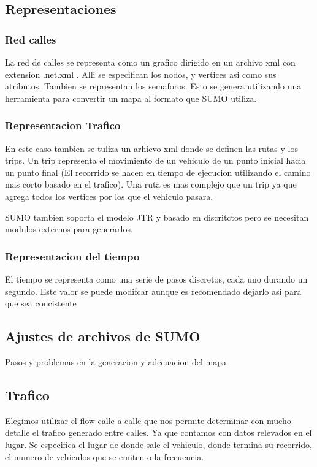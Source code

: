 \subsection{Representaciones}

\subsubsection{Red calles}
La red de calles se representa como un grafico dirigido en un archivo xml con extension .net.xml . Alli se especifican los nodos, y vertices asi como sus atributos. Tambien se representan los semaforos. Esto  se genera utilizando una herramienta  para convertir un mapa al formato que SUMO utiliza.

\subsubsection{Representacion Trafico}
En este caso tambien se tuliza un arhicvo xml donde se definen las rutas y los trips. Un trip representa el movimiento de un vehiculo de un punto inicial hacia un punto final (El recorrido se hacen en tiempo de ejecucion utilizando el camino mas corto basado en el trafico). Una ruta es mas complejo que un trip ya que agrega todos los vertices por los que el vehiculo pasara.

SUMO tambien soporta el modelo JTR y basado en discritctos pero se necesitan modulos externos para generarlos.

\subsubsection{Representacion del tiempo}
El tiempo se representa como una serie de pasos discretos, cada uno durando un segundo. Este valor se puede modifcar aunque es recomendado dejarlo asi para que sea concistente


\subsection{Ajustes de archivos de SUMO}
Pasos y problemas en la generacion y adecuacion del mapa

\subsection{Trafico}
Elegimos utilizar el flow calle-a-calle que nos permite determinar con mucho detalle el trafico generado entre calles. Ya que contamos con datos relevados en el lugar. Se especifica el lugar de donde sale el vehiculo, donde termina su recorrido, el numero de vehiculos que se emiten o la frecuencia.

